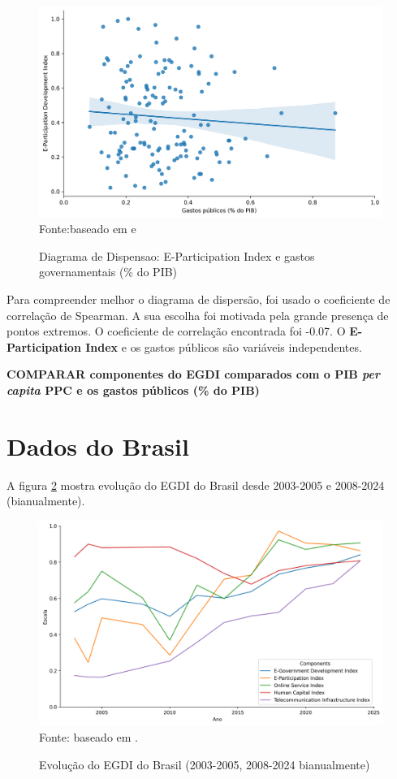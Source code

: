 \begin{figure}[H]
	\centering
	\caption{Diagrama de Dispensao: E-Participation Index e gastos governamentais (\% do PIB)}
	\includegraphics[width=1\linewidth]{figuras/egdi/dispersao_epart_govexpenditure}
	\label{fig:dispersao_epart_govexpenditure}
	\footnotesize{Fonte:baseado em \cite{ONU_EGDI_mapa} e \cite{FMI_gov_expenditure}}
\end{figure}

Para compreender melhor o diagrama de dispersão, foi usado o coeficiente de correlação de Spearman. A sua escolha foi motivada pela grande presença de pontos extremos. O coeficiente de correlação encontrada foi -0.07. O \textbf{E-Participation Index} e os gastos públicos são variáveis independentes.

\textbf{COMPARAR componentes do EGDI comparados com o PIB \textit{per capita} PPC e os gastos públicos (\% do PIB)}

\section{Dados do Brasil}

A figura \ref{fig:lineplot_egdi_brasil} mostra evolução do EGDI do Brasil desde 2003-2005 e 2008-2024 (bianualmente).

\begin{figure}[H]
	\centering
	\caption{Evolução do EGDI do Brasil (2003-2005, 2008-2024 bianualmente)}
	\includegraphics[width=1\linewidth]{figuras/egdi/lineplot_egdi_brasil.png}
	\label{fig:lineplot_egdi_brasil}
	\footnotesize{Fonte: baseado em \cite{ONU_EGDI_mapa}.}
\end{figure}

